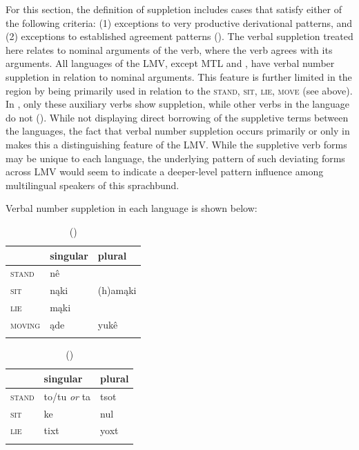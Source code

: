\documentclass[output=paper]{LSP/langsci}
\begin{document}
	For this section, the definition of suppletion includes cases that satisfy either of the following criteria: (1) exceptions to very productive derivational patterns, and (2) exceptions to established agreement patterns (\citealt[3]{Veselinova2003}). The verbal suppletion treated here relates to nominal arguments of the verb, where the verb agrees with its arguments. All languages of the LMV, except MTL and , have verbal number suppletion in relation to nominal arguments. This feature is further limited in the region by being primarily used in relation to the  \textsc{stand}, \textsc{sit}, \textsc{lie}, \textsc{move} (see above). In , only these auxiliary verbs show suppletion, while other verbs in the language do not (\citealt[40]{Haas1946}). While not displaying direct borrowing of the suppletive terms between the languages, the fact that verbal number suppletion occurs primarily or only in  makes this a distinguishing feature of the LMV. While the suppletive verb forms may be unique to each language, the underlying pattern of such deviating forms across LMV  would seem to indicate a deeper-level pattern influence among multilingual speakers of this sprachbund.

	Verbal number suppletion in each language is shown below:

\begin{table}
\caption{ (\citealt[3]{DorseySwanton1912})}
\begin{tabularx}{.5\textwidth}{XXX}
\lsptoprule
& singular & plural \\
\midrule
\textsc{stand} & nê & \\
\textsc{sit} & nąki & (h)amąki \\
 \textsc{lie} & mąki & \\ 
 \textsc{moving} & ąde & yukê \\
 \lspbottomrule
\end{tabularx}
\end{table}
\footnotetext{}

\begin{table}
\caption{ (\citealt[3]{GatschetSwanton1932})}
\begin{tabularx}{.5\textwidth}{XXX }
\lsptoprule
& singular & plural \\
\midrule
\textsc{stand} & to/tu \emph{or} ta & tsot \\
\textsc{sit} & ke & nul \\
\textsc{lie} & tixt & yoxt \\
\lspbottomrule
\end{tabularx} 
\end{table}
\end{document}
